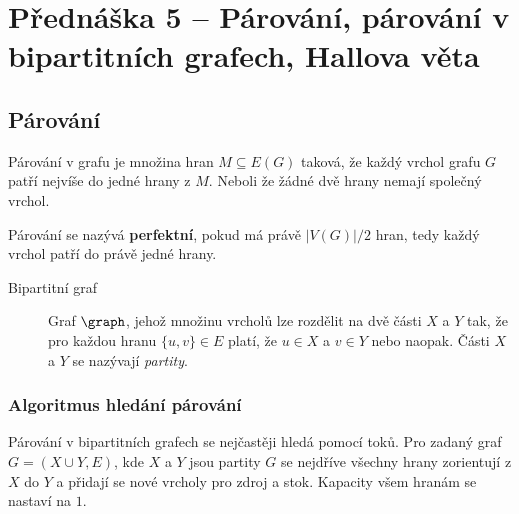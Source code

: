 \section{Přednáška 5 -- Párování, párování v bipartitních grafech, Hallova věta}

\subsection{Párování}

Párování v grafu je množina hran \(M \subseteq E(G)\) taková, že každý vrchol grafu $G$ patří nejvíše do jedné hrany z $M$.
Neboli že žádné dvě hrany nemají společný vrchol.

Párování se nazývá \textbf{perfektní}, pokud má právě \(|V(G)| / 2 \) hran, tedy každý vrchol patří do právě jedné hrany.

\begin{description}
    \item[Bipartitní graf] Graf $\graph$, jehož množinu vrcholů lze rozdělit na dvě části $X$ a $Y$ tak, že pro každou hranu $\{u,v\} \in E$ platí, že $u \in X$ a $v \in Y$ nebo naopak.
    Části $X$ a $Y$ se nazývají \textit{partity}.
\end{description}

\subsubsection{Algoritmus hledání párování}\label{alg:parovani-v-bip-grafech}

Párování v bipartitních grafech se nejčastěji hledá pomocí toků.
Pro zadaný graf\newline $G=(X \cup Y,E)$, kde $X$ a $Y$ jsou partity $G$ se nejdříve všechny hrany zorientují z $X$ do $Y$ a přidají se nové vrcholy pro zdroj a stok.
Kapacity všem hranám se nastaví na $1$.

\label{lemma:edmondsova-veta}



\label{lemma:slozitost-parovani}

